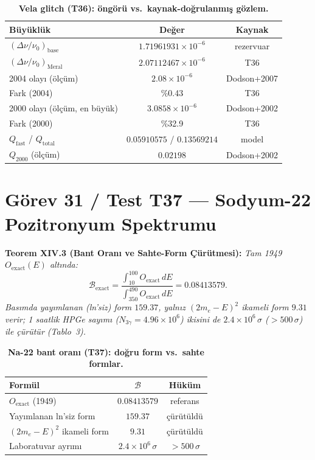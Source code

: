 \documentclass[12pt,a4paper]{article}
\begin{document}
\begin{table}[!htbp]
\centering\footnotesize
\setlength{\tabcolsep}{3pt}
\caption{\textbf{Vela glitch (T36): öngörü vs.\ kaynak-doğrulanmış gözlem.}}
\label{tab:vela}
\vspace{0.1cm}
\begin{tabular}{@{}l|c|c@{}}
\toprule
Büyüklük & Değer & Kaynak \\
\midrule
$(\Delta\nu/\nu_0)_{\mathrm{base}}$ & $1.71961931\times 10^{-6}$ & rezervuar \\
$(\Delta\nu/\nu_0)_{\mathrm{Meral}}$ & $2.07112467\times 10^{-6}$ & T36 \\
2004 olayı (ölçüm) & $2.08\times 10^{-6}$ & Dodson+2007 \\
Fark (2004) & \%0.43 & T36 \\
2000 olayı (ölçüm, en büyük) & $3.0858\times 10^{-6}$ & Dodson+2002 \\
Fark (2000) & \%32.9 & T36 \\
$Q_{\mathrm{fast}}$ / $Q_{\mathrm{total}}$ & $0.05910575$ / $0.13569214$ & model \\
$Q_{2000}$ (ölçüm) & $0.02198$ & Dodson+2002 \\
\bottomrule
\end{tabular}
\end{table}

\section{Görev 31 / Test T37 --- Sodyum-22 Pozitronyum Spektrumu}

\textbf{Teorem XIV.3 (Bant Oranı ve Sahte-Form Çürütmesi):}
\textit{Tam 1949 $O_{\mathrm{exact}}(E)$ altında:}
\begin{equation}
\boxed{\mathcal{B}_{\mathrm{exact}}
=\frac{\int_{10}^{100}O_{\mathrm{exact}}\,dE}
{\int_{350}^{490}O_{\mathrm{exact}}\,dE}=0.08413579.}
\end{equation}
\textit{Basımda yayımlanan (ln'siz) form $159.37$, yalnız
$(2m_e-E)^2$ ikameli form $9.31$ verir;
1 saatlik HPGe sayımı ($N_{3\gamma}=4.96\times 10^6$) ikisini de
$2.4\times 10^6\,\sigma$ ($>500\,\sigma$) ile çürütür (Tablo~3).}

\begin{table}[!htbp]
\centering\footnotesize
\setlength{\tabcolsep}{3pt}
\caption{\textbf{Na-22 bant oranı (T37): doğru form vs.\ sahte formlar.}}
\label{tab:na22}
\vspace{0.1cm}
\begin{tabular}{@{}l|c|c@{}}
\toprule
Formül & $\mathcal{B}$ & Hüküm \\
\midrule
$O_{\mathrm{exact}}$ (1949) & $0.08413579$ & referans \\
Yayımlanan ln'siz form & $159.37$ & çürütüldü \\
$(2m_e-E)^2$ ikameli form & $9.31$ & çürütüldü \\
Laboratuvar ayrımı & $2.4\times 10^6\,\sigma$ & $>500\,\sigma$ \\
\bottomrule
\end{tabular}
\end{table}
\end{document}
